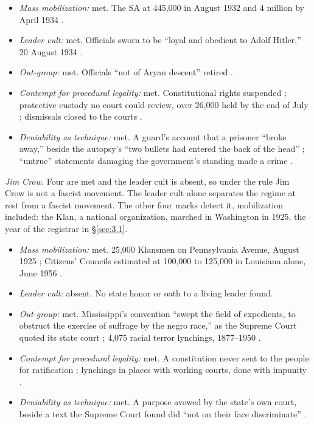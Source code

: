 \begin{itemize}
\item \emph{Mass mobilization:} met. The SA at 445,000 in August 1932 and 4 million by April 1934 \autocite{ushmm2025sa}.
\item \emph{Leader cult:} met. Officials sworn to be “loyal and obedient to Adolf Hitler,” 20 August 1934 \autocite{eid1934}.
\item \emph{Out-group:} met. Officials “not of Aryan descent” retired \autocite[sec.~3]{bbg1933}.
\item \emph{Contempt for procedural legality:} met. Constitutional rights suspended \autocite{vo1933volkstaat}; protective custody no court could review, over 26,000 held by the end of July \autocite{altmann2015schutzhaft}; dismissals closed to the courts \autocite[sec.~7]{bbg1933}.
\item \emph{Deniability as technique:} met. A guard's account that a prisoner “broke away,” beside the autopsy's “two bullets had entered the back of the head” \autocite{ps641}; “untrue” statements damaging the government's standing made a crime \autocite[sec.~3]{heimtuecke1933}.
\end{itemize}

\emph{Jim Crow.} Four are met and the leader cult is absent, so under the rule Jim Crow is not a fascist movement. The leader cult alone separates the regime at rest from a fascist movement. The other four marks detect it, mobilization included: the Klan, a national organization, marched in Washington in 1925, the year of the registrar in \S\ref{sec:3.1}.

\begin{itemize}
\item \emph{Mass mobilization:} met. 25,000 Klansmen on Pennsylvania Avenue, August 1925 \autocite{rrchnm2025klan}; Citizens' Councils estimated at 100,000 to 125,000 in Louisiana alone, June 1956 \autocite{mclemore2025councils}.
\item \emph{Leader cult:} absent. No state honor or oath to a living leader found.
\item \emph{Out-group:} met. Mississippi's convention “swept the field of expedients, to obstruct the exercise of suffrage by the negro race,” as the Supreme Court quoted its state court \autocite{williams1898}; 4,075 racial terror lynchings, 1877–1950 \autocite{eji2017lynching}.
\item \emph{Contempt for procedural legality:} met. A constitution never sent to the people for ratification \autocite{skatesms1890constitution}; lynchings in places with working courts, done with impunity \autocite{eji2017lynching}.
\item \emph{Deniability as technique:} met. A purpose avowed by the state's own court, beside a text the Supreme Court found did “not on their face discriminate” \autocite{williams1898}.
\end{itemize}

